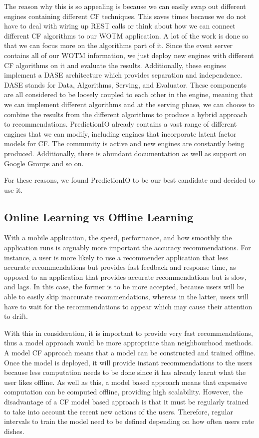 The reason why this is so appealing is because we can easily swap out different engines containing different CF techniques. This saves times because we do not have to deal with wiring up REST calls or think about how we can connect different CF algorithms to our WOTM application. A lot of the work is done so that we can focus more on the algorithms part of it. Since the event server contains all of our WOTM information, we just deploy new engines with different CF algorithms on it and evaluate the results. Additionally, these engines implement a DASE architecture which provides separation and independence. DASE stands for Data, Algorithms, Serving, and Evaluator. These components are all considered to be loosely coupled to each other in the engine, meaning that we can implement different algorithms and at the serving phase, we can choose to combine the results from the different algorithms to produce a hybrid approach to recommendations. 
PredictionIO already contains a vast range of different engines that we can modify, including engines that incorporate latent factor models for CF. The community is active and new engines are constantly being produced. Additionally, there is abundant documentation as well as support on Google Groups and so on. 

For these reasons, we found PredictionIO to be our best candidate and decided to use it. 

\subsection{Online Learning vs Offline Learning}

With a mobile application, the speed, performance, and how smoothly the application runs is arguably more important the accuracy recommendations. For instance, a user is more likely to use a recommender application that less accurate recommendations but provides fast feedback and response time, as opposed to an application that provides accurate recommendations but is slow, and lags. In this case, the former is to be more accepted, because users will be able to easily skip inaccurate recommendations, whereas in the latter, users will have to wait for the recommendations to appear which may cause their attention to drift. 

With this in consideration, it is important to provide very fast recommendations, thus a model approach would be more appropriate than neighbourhood methods. A model CF approach means that a model can be constructed and trained offline. Once the model is deployed, it will provide instant recommendations to the users because less computation needs to  be done since it has already learnt what the user likes offline. As well as this, a model based approach means that expensive computation can be computed offline, providing high scalability. However, the disadvantage of a CF model based approach is that it must be regularly trained to take into account the recent new actions of the users. Therefore, regular intervals to train the model need to be defined depending on how often users rate dishes.

